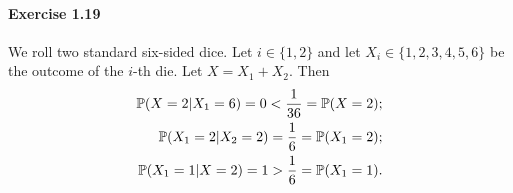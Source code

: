 \paragraph{Exercise 1.19} We roll two standard six-sided dice. Let $i \in \{ 1, 2 \}$
and let $X_i \in \{ 1, 2, 3, 4, 5, 6 \}$ be the outcome of the $i$-th die. Let
$X = X_1 + X_2$. Then
\begin{align*}
  \mathbb{P}(X = 2 | X_1 = 6) = 0 < \frac{1}{36} = \mathbb{P}(X = 2); \\
  \mathbb{P}(X_1 = 2 | X_2 = 2) = \frac{1}{6} = \mathbb{P}(X_1 = 2); \\
  \mathbb{P}(X_1 = 1 | X = 2) = 1 > \frac{1}{6} = \mathbb{P}(X_1 = 1).
\end{align*}
